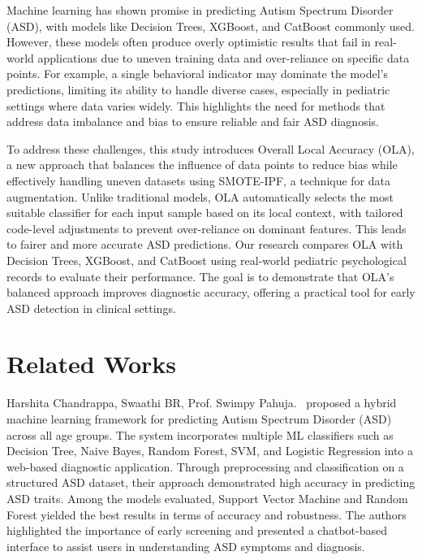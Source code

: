 \documentclass[conference]{IEEEtran}
\begin{document}
Machine learning has shown promise in predicting Autism Spectrum Disorder (ASD), with models like Decision Trees, XGBoost, and CatBoost commonly used. However, these models often produce overly optimistic results that fail in real-world applications due to uneven training data and over-reliance on specific data points. For example, a single behavioral indicator may dominate the model’s predictions, limiting its ability to handle diverse cases, especially in pediatric settings where data varies widely. This highlights the need for methods that address data imbalance and bias to ensure reliable and fair ASD diagnosis.

To address these challenges, this study introduces Overall Local Accuracy (OLA), a new approach that balances the influence of data points to reduce bias while effectively handling uneven datasets using SMOTE-IPF, a technique for data augmentation. Unlike traditional models, OLA automatically selects the most suitable classifier for each input sample based on its local context, with tailored code-level adjustments to prevent over-reliance on dominant features. This leads to fairer and more accurate ASD predictions. Our research compares OLA with Decision Trees, XGBoost, and CatBoost using real-world pediatric psychological records to evaluate their performance. The goal is to demonstrate that OLA’s balanced approach improves diagnostic accuracy, offering a practical tool for early ASD detection in clinical settings.

\section{Related Works}

Harshita Chandrappa, Swaathi BR, Prof. Swimpy Pahuja.~\cite{b1} proposed a hybrid machine learning framework for predicting Autism Spectrum Disorder (ASD) across all age groups. The system incorporates multiple ML classifiers such as Decision Tree, Naive Bayes, Random Forest, SVM, and Logistic Regression into a web-based diagnostic application. Through preprocessing and classification on a structured ASD dataset, their approach demonstrated high accuracy in predicting ASD traits. Among the models evaluated, Support Vector Machine and Random Forest yielded the best results in terms of accuracy and robustness. The authors highlighted the importance of early screening and presented a chatbot-based interface to assist users in understanding ASD symptoms and diagnosis.
\end{document}
